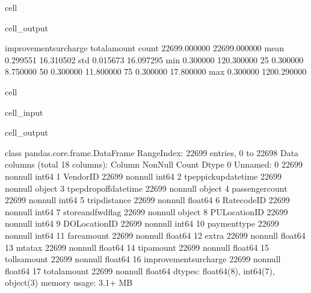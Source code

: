 \documentclass[letterpaper,10pt,english]{sphinxmanual}
\begin{document}
\begin{sphinxuseclass}{cell}
\begin{sphinxuseclass}{cell_output}
\begin{sphinxVerbatim}[commandchars=\\\{\}]
       improvement\PYGZus{}surcharge  total\PYGZus{}amount  
count           22699.000000  22699.000000  
mean                0.299551     16.310502  
std                 0.015673     16.097295  
min                \PYGZhy{}0.300000   \PYGZhy{}120.300000  
25\PYGZpc{}                 0.300000      8.750000  
50\PYGZpc{}                 0.300000     11.800000  
75\PYGZpc{}                 0.300000     17.800000  
max                 0.300000   1200.290000  
\end{sphinxVerbatim}

\end{sphinxuseclass}
\end{sphinxuseclass}
\begin{sphinxuseclass}{cell}
\begin{sphinxuseclass}{cell_input}
\begin{sphinxVerbatim}[commandchars=\\\{\}]
\end{sphinxVerbatim}

\end{sphinxuseclass}
\begin{sphinxuseclass}{cell_output}
\begin{sphinxVerbatim}[commandchars=\\\{\}]
\PYGZlt{}class \PYGZsq{}pandas.core.frame.DataFrame\PYGZsq{}\PYGZgt{}
RangeIndex: 22699 entries, 0 to 22698
Data columns (total 18 columns):
 \PYGZsh{}   Column                 Non\PYGZhy{}Null Count  Dtype  
\PYGZhy{}\PYGZhy{}\PYGZhy{}  \PYGZhy{}\PYGZhy{}\PYGZhy{}\PYGZhy{}\PYGZhy{}\PYGZhy{}                 \PYGZhy{}\PYGZhy{}\PYGZhy{}\PYGZhy{}\PYGZhy{}\PYGZhy{}\PYGZhy{}\PYGZhy{}\PYGZhy{}\PYGZhy{}\PYGZhy{}\PYGZhy{}\PYGZhy{}\PYGZhy{}  \PYGZhy{}\PYGZhy{}\PYGZhy{}\PYGZhy{}\PYGZhy{}  
 0   Unnamed: 0             22699 non\PYGZhy{}null  int64  
 1   VendorID               22699 non\PYGZhy{}null  int64  
 2   tpep\PYGZus{}pickup\PYGZus{}datetime   22699 non\PYGZhy{}null  object 
 3   tpep\PYGZus{}dropoff\PYGZus{}datetime  22699 non\PYGZhy{}null  object 
 4   passenger\PYGZus{}count        22699 non\PYGZhy{}null  int64  
 5   trip\PYGZus{}distance          22699 non\PYGZhy{}null  float64
 6   RatecodeID             22699 non\PYGZhy{}null  int64  
 7   store\PYGZus{}and\PYGZus{}fwd\PYGZus{}flag     22699 non\PYGZhy{}null  object 
 8   PULocationID           22699 non\PYGZhy{}null  int64  
 9   DOLocationID           22699 non\PYGZhy{}null  int64  
 10  payment\PYGZus{}type           22699 non\PYGZhy{}null  int64  
 11  fare\PYGZus{}amount            22699 non\PYGZhy{}null  float64
 12  extra                  22699 non\PYGZhy{}null  float64
 13  mta\PYGZus{}tax                22699 non\PYGZhy{}null  float64
 14  tip\PYGZus{}amount             22699 non\PYGZhy{}null  float64
 15  tolls\PYGZus{}amount           22699 non\PYGZhy{}null  float64
 16  improvement\PYGZus{}surcharge  22699 non\PYGZhy{}null  float64
 17  total\PYGZus{}amount           22699 non\PYGZhy{}null  float64
dtypes: float64(8), int64(7), object(3)
memory usage: 3.1+ MB
\end{sphinxVerbatim}


\end{sphinxuseclass}
\end{sphinxuseclass}
\end{document}
